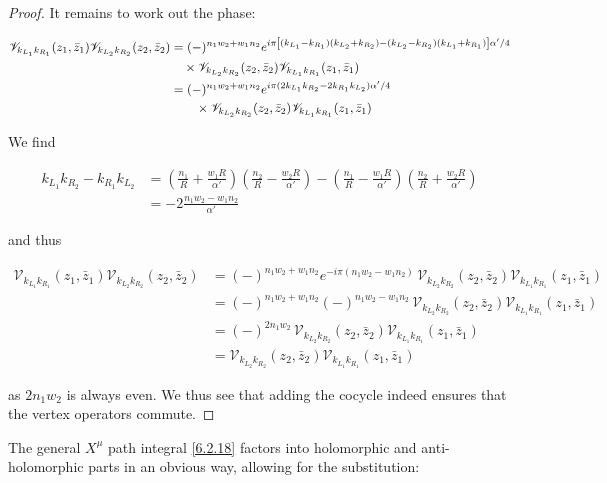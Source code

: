 \begin{tcolorbox}[breakable]
\begin{proof}
		It remains to work out the phase:
		
		\begin{align}
			\mathscr{V}_{k_{L_1}k_{R_1}}(z_1,\bar z_1)\mathscr{V}_{k_{L_2}k_{R_2}}(z_2,\bar z_2)
			&= (-)^{n_1w_2+w_1n_2}e^{i\pi\left[(k_{L_1}-k_{R_1})(k_{L_2}+k_{R_2})-(k_{L_2}-k_{R_2})(k_{L_1}+k_{R_1})\right]\alpha'/4} \nonumber\\
			&\quad \times \mathscr{V}_{k_{L_2}k_{R_2}}(z_2,\bar z_2)\mathscr{V}_{k_{L_1}k_{R_1}}(z_1,\bar z_1) \nonumber\\
			&= (-)^{n_1w_2+w_1n_2}e^{i\pi(2k_{L_1}k_{R_2}-2k_{R_1}k_{L_2})\alpha'/4}\notag\\
			&\qquad\times\mathscr{V}_{k_{L_2}k_{R_2}}(z_2,\bar z_2)\mathscr{V}_{k_{L_1}k_{R_1}}(z_1,\bar z_1) 
		\end{align}
		
		We find
		
		\begin{align}
			k_{L_1}k_{R_2} - k_{R_1}k_{L_2}
			&= \left( \frac{n_1}{R} + \frac{w_1R}{\alpha'} \right) \left( \frac{n_2}{R} - \frac{w_2R}{\alpha'} \right) - \left( \frac{n_1}{R} - \frac{w_1R}{\alpha'} \right) \left( \frac{n_2}{R} + \frac{w_2R}{\alpha'} \right) \nonumber\\
			&= -2 \frac{n_1w_2 - w_1n_2}{\alpha'}
		\end{align}
		
		and thus
		
		\begin{align}
			\mathscr{V}_{k_{L_1}k_{R_1}}(z_1,\bar z_1)\mathscr{V}_{k_{L_2}k_{R_2}}(z_2,\bar z_2)
			&= (-)^{n_1w_2 + w_1n_2}e^{-i\pi(n_1w_2 - w_1n_2)}\,
			\mathscr{V}_{k_{L_2}k_{R_2}}(z_2,\bar z_2)\mathscr{V}_{k_{L_1}k_{R_1}}(z_1,\bar z_1) \nonumber\\
			&= (-)^{n_1w_2 + w_1n_2}(-)^{n_1w_2 - w_1n_2}\,
			\mathscr{V}_{k_{L_2}k_{R_2}}(z_2,\bar z_2)\mathscr{V}_{k_{L_1}k_{R_1}}(z_1,\bar z_1) \nonumber\\
			&= (-)^{2n_1w_2}\,
			\mathscr{V}_{k_{L_2}k_{R_2}}(z_2,\bar z_2)\mathscr{V}_{k_{L_1}k_{R_1}}(z_1,\bar z_1) \nonumber\\
			&= \mathscr{V}_{k_{L_2}k_{R_2}}(z_2,\bar z_2)\mathscr{V}_{k_{L_1}k_{R_1}}(z_1,\bar z_1)
		\end{align}
		
		as \( 2n_1w_2 \) is always even. We thus see that adding the cocycle indeed ensures that the vertex operators commute.
	\end{proof}
\end{tcolorbox}
The general $X^{\mu}$ path integral \eqref{6.2.18} factors into holomorphic and anti-holomorphic parts in an obvious way, allowing for the substitution:
